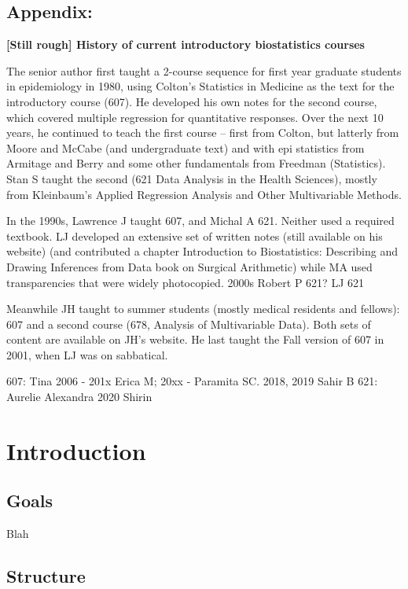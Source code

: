 \documentclass[]{book}
\begin{document}
\hypertarget{appendix-1}{%
\section{Appendix:}\label{appendix-1}}

\textbf{{[}Still rough{]} History of current introductory biostatistics courses}

The senior author first taught a 2-course sequence for first year graduate students in epidemiology in 1980, using Colton's Statistics in Medicine as the text for the introductory course (607). He developed his own notes for the second course, which covered multiple regression for quantitative responses. Over the next 10 years, he continued to teach the first course -- first from Colton, but latterly from Moore and McCabe (and undergraduate text) and with epi statistics from Armitage and Berry and some other fundamentals from Freedman
(Statistics). Stan S taught the second (621 Data Analysis in the Health Sciences), mostly from Kleinbaum's Applied Regression Analysis and Other Multivariable Methods.

In the 1990s, Lawrence J taught 607, and Michal A 621. Neither used a required textbook. LJ developed an extensive set of written notes (still available on his website) (and contributed a chapter Introduction to Biostatistics: Describing and Drawing Inferences from Data
book on Surgical Arithmetic) while MA used transparencies that were widely photocopied. 2000s Robert P 621? LJ 621

Meanwhile JH taught to summer students (mostly medical residents and fellows): 607 and a second course (678, Analysis of Multivariable Data). Both sets of content are available on JH's website. He last taught the Fall version of 607 in 2001, when LJ was on sabbatical.

607: Tina 2006 - 201x Erica M; 20xx - Paramita SC. 2018, 2019 Sahir B
621: Aurelie Alexandra 2020 Shirin

\hypertarget{introduction}{%
\chapter{Introduction}\label{introduction}}

\hypertarget{goals-1}{%
\section{Goals}\label{goals-1}}

Blah

\hypertarget{structure-1}{%
\section{Structure}\label{structure-1}}
\end{document}
